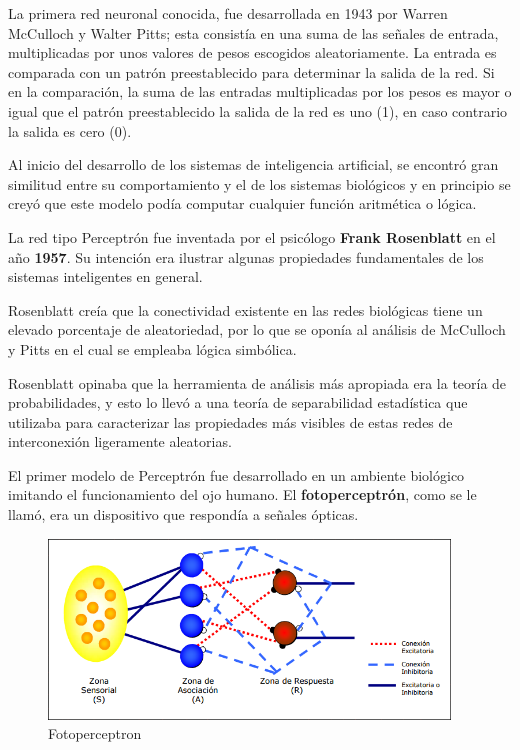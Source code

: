 \documentclass[a4paper, 11pt]{article} %
\begin{document}
La primera red neuronal conocida, fue desarrollada en 1943 por Warren McCulloch y Walter Pitts; esta consistía en una suma de las señales de entrada, multiplicadas por unos valores de pesos escogidos aleatoriamente. La entrada es comparada con un patrón preestablecido para determinar la salida de la red. Si en la comparación, la suma de las entradas multiplicadas por los pesos es mayor o igual que el patrón preestablecido la salida de la red es uno (1), en caso contrario la salida es cero (0).

Al inicio del desarrollo de los sistemas de inteligencia artificial, se encontró gran similitud entre su comportamiento y el de los sistemas biológicos y en principio se creyó que este modelo podía computar cualquier función aritmética o lógica.

La red tipo Perceptrón fue inventada por el psicólogo \textbf{Frank Rosenblatt} en el año \textbf{1957}. Su intención era ilustrar algunas propiedades fundamentales de los sistemas inteligentes en general.

Rosenblatt creía que la conectividad existente en las redes biológicas tiene un elevado porcentaje de aleatoriedad, por lo que se oponía al análisis de McCulloch y Pitts en el cual se empleaba lógica simbólica.

Rosenblatt opinaba que la herramienta de análisis más apropiada era la teoría de probabilidades, y esto lo llevó a una teoría de separabilidad estadística que utilizaba para caracterizar las propiedades más visibles de estas redes de interconexión ligeramente aleatorias.

El primer modelo de Perceptrón fue desarrollado en un ambiente biológico imitando el funcionamiento del ojo humano. El \textbf{fotoperceptrón}, como se le llamó, era un dispositivo que respondía a señales ópticas.

\begin{figure}[H]
\centering
\includegraphics[width=0.95\textwidth]{Fotoperceptron.PNG}
\caption{Fotoperceptron}
\label{Fotoperceptron}
\end{figure}
\end{document}
